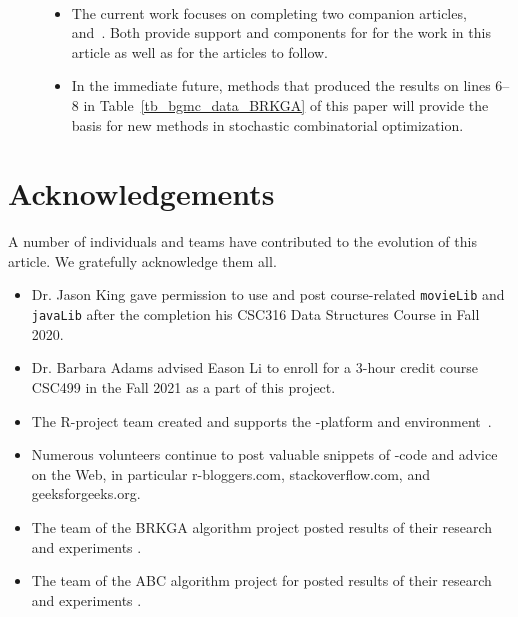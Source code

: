 \begin{description}
\item[]~\
\begin{itemize}
\item
The current work focuses on completing two 
companion 
articles,~\cite{OPUS2-2022-coupon-arxiv-Brglez} 
and~\cite{OPUS2-2022-mclass-arxiv-Brglez}.
Both provide support and components for 
for the work in this article as well as for the
articles to follow.
\item
In the immediate future, methods that produced the results 
on lines 6--8 in Table~\ref{tb_bgmc_data_BRKGA} of this paper
will provide the basis for
new methods in stochastic combinatorial optimization. 

\end{itemize}

\end{description}

\section*{Acknowledgements}
\vspace*{-0.5ex}\noindent
A number of individuals and teams have
contributed to the evolution of this article.
We gratefully acknowledge them all.

\begin{itemize}
\item
Dr. Jason King gave permission to use and post course-related {\tt movieLib} and {\tt javaLib} 
after the completion his CSC316 Data Structures Course in Fall 2020.
\item
Dr. Barbara Adams advised Eason Li to enroll for a 3-hour credit course 
CSC499 in the Fall 2021 as a part of this project.
\item
The R-project team created and supports the \R-platform and environment~\cite{OPUS-R-manual}.
\item
Numerous volunteers continue to 
post valuable snippets of \R-code and advice on the Web, in particular
r-bloggers.com, stackoverflow.com, and geeksforgeeks.org.
\item
The team of the BRKGA algorithm project posted results of their research and experiments
\cite{OPUS-setc-2014-BRKGA-Resende-code,OPUS-setc-2014-BRKGA-Resende}.
\item
The team of the  ABC algorithm project for posted results of their research and experiments
\cite{OPUS-setc-2014-SWJ-Broderick-Bee_Colony}.
\end{itemize}
